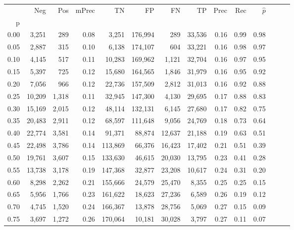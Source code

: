 \begin{tabular}{rrrrrrrrrrrrrr}
\toprule
{} &     Neg &    Pos & mPrec &       TN &       FP &      FN &      TP &  Prec &   Rec & $\hat{p}$ \\
p    &         &        &       &          &          &         &         &       &       &           \\
\midrule
0.00 &   3,251 &    289 &  0.08 &    3,251 &  176,994 &     289 &  33,536 &  0.16 &  0.99 &      0.98 \\
0.05 &   2,887 &    315 &  0.10 &    6,138 &  174,107 &     604 &  33,221 &  0.16 &  0.98 &      0.97 \\
0.10 &   4,145 &    517 &  0.11 &   10,283 &  169,962 &   1,121 &  32,704 &  0.16 &  0.97 &      0.95 \\
0.15 &   5,397 &    725 &  0.12 &   15,680 &  164,565 &   1,846 &  31,979 &  0.16 &  0.95 &      0.92 \\
0.20 &   7,056 &    966 &  0.12 &   22,736 &  157,509 &   2,812 &  31,013 &  0.16 &  0.92 &      0.88 \\
0.25 &  10,209 &  1,318 &  0.11 &   32,945 &  147,300 &   4,130 &  29,695 &  0.17 &  0.88 &      0.83 \\
0.30 &  15,169 &  2,015 &  0.12 &   48,114 &  132,131 &   6,145 &  27,680 &  0.17 &  0.82 &      0.75 \\
0.35 &  20,483 &  2,911 &  0.12 &   68,597 &  111,648 &   9,056 &  24,769 &  0.18 &  0.73 &      0.64 \\
0.40 &  22,774 &  3,581 &  0.14 &   91,371 &   88,874 &  12,637 &  21,188 &  0.19 &  0.63 &      0.51 \\
0.45 &  22,498 &  3,786 &  0.14 &  113,869 &   66,376 &  16,423 &  17,402 &  0.21 &  0.51 &      0.39 \\
0.50 &  19,761 &  3,607 &  0.15 &  133,630 &   46,615 &  20,030 &  13,795 &  0.23 &  0.41 &      0.28 \\
0.55 &  13,738 &  3,178 &  0.19 &  147,368 &   32,877 &  23,208 &  10,617 &  0.24 &  0.31 &      0.20 \\
0.60 &   8,298 &  2,262 &  0.21 &  155,666 &   24,579 &  25,470 &   8,355 &  0.25 &  0.25 &      0.15 \\
0.65 &   5,956 &  1,766 &  0.23 &  161,622 &   18,623 &  27,236 &   6,589 &  0.26 &  0.19 &      0.12 \\
0.70 &   4,745 &  1,520 &  0.24 &  166,367 &   13,878 &  28,756 &   5,069 &  0.27 &  0.15 &      0.09 \\
0.75 &   3,697 &  1,272 &  0.26 &  170,064 &   10,181 &  30,028 &   3,797 &  0.27 &  0.11 &      0.07 \\

\end{tabular}
